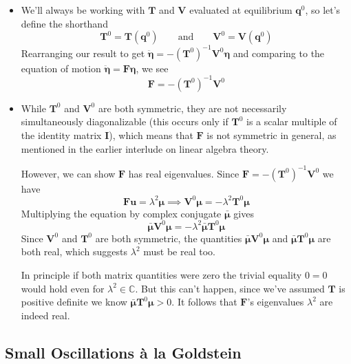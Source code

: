 \documentclass[11pt, a4paper]{article}
\newcommand{\eqtext}[1]{\qquad \text{#1} \qquad}
\newcommand{\bddot}[1]{\ddot{\bm{#1}}}
\newcommand{\mat}[1]{\mathbf{#1}}
\begin{document}
\begin{itemize}
	\item We'll always be working with $ \mat{T} $ and $ \mat{V} $ evaluated at equilibrium $ \bm{q}^{0} $, so let's define the shorthand
	\begin{equation*}
		\mat{T}^{0} = \mat{T}(\bm{q}^{0}) \eqtext{and} \mat{V}^{0} = \mat{V}(\bm{q}^{0})
	\end{equation*}
	Rearranging our result to get $ \bddot{\eta} = - \left(\mat{T}^{0}\right)^{-1}\mat{V}^{0} \bm{\eta} $ and comparing to the equation of motion $ \bddot{\eta} = \mat{F} \bm{\eta} $, we see
	\begin{equation*}
		\mat{F} = - \left (\mat{T}^{0}\right )^{-1} \mat{V}^{0}
	\end{equation*}
	
	\item While $ \mat{T}^{0} $ and $ \mat{V}^{0} $ are both symmetric, they are not necessarily simultaneously diagonalizable (this occurs only if $ \mat{T}^{0} $ is a scalar multiple of the identity matrix $ \mat{I} $), which means that $ \mat{F} $ is not symmetric in general, as mentioned in the earlier interlude on linear algebra theory.
	
	However, we can show $ \bm{F} $ has real eigenvalues. Since $ \mat{F} = - \left (\mat{T}^{0}\right )^{-1} \mat{V}^{0} $ we have
	\begin{equation*}
		\mat{F}\bm{u} = \lambda^{2} \bm{\mu} \implies \mat{V}^{0}\bm{\mu} = - \lambda^{2} \mat{T}^{0} \bm{\mu}
	\end{equation*}
	Multiplying the equation by complex conjugate $ \bar{\bm{\mu}} $ gives
	\begin{equation*}
		\bar{\bm{\mu}} \mat{V}^{0}\bm{\mu} = - \lambda^{2} \bar{\bm{\mu}} \mat{T}^{0} \bm{\mu}
	\end{equation*}
	Since $ \mat{V}^{0}  $ and $ \mat{T}^{0} $ are both symmetric, the quantities $ \bar{\bm{\mu}} \mat{V}^{0}\bm{\mu} $ and $ \bar{\bm{\mu}} \mat{T}^{0} \bm{\mu} $ are both real, which suggests $ \lambda^{2} $ must be real too.
	
	In principle if both matrix quantities were zero the trivial equality $ 0 = 0 $ would hold even for $ \lambda^{2} \in \mathbb{C} $. But this can't happen, since we've assumed $ \mat{T} $ is positive definite we know $\bar{\bm{\mu}} \mat{T}^{0} \bm{\mu} > 0 $. It follows that $ \mat{F} $'s eigenvalues $ \lambda^{2} $ are indeed real.
\end{itemize}

\subsection{Small Oscillations \`{a} la Goldstein}
\end{document}
